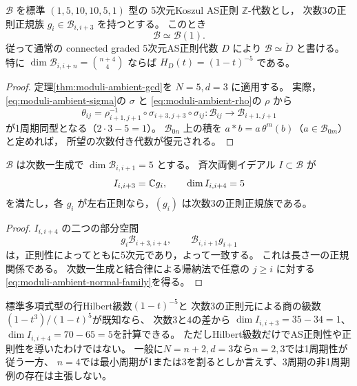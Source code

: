 \begin{corollary}\label{cor:moduli-cubic-ambient-periodic}
$\mathcal B$ を標準 $(1,5,10,10,5,1)$ 型の
5次元Koszul AS正則 $\mathbb Z$-代数とし，
次数3の正則正規族 $g_i\in\mathcal B_{i,i+3}$ を持つとする。
このとき
\begin{equation}
 \mathcal B\simeq\mathcal B(1).
\end{equation}
従って通常の connected graded 5次元AS正則代数 $D$ により
$\mathcal B\simeq\check D$ と書ける。
特に $\dim\mathcal B_{i,i+n}=\binom{n+4}{4}$ ならば
$H_D(t)=(1-t)^{-5}$ である。
\end{corollary}
\begin{proof}
定理\ref{thm:moduli-ambient-gcd}を $N=5,d=3$ に適用する。
実際，\eqref{eq:moduli-ambient-sigma}の $\sigma$ と
\eqref{eq:moduli-ambient-rho}の $\rho$ から
\begin{equation}
 \theta_{ij}=
 \rho^{-1}_{i+1,j+1}\circ
 \sigma_{i+3,j+3}\circ\sigma_{ij}:
 \mathcal B_{ij}\longrightarrow\mathcal B_{i+1,j+1}
\end{equation}
が1周期同型となる（$2\cdot3-5=1$）。
$\mathcal B_{0n}$ 上の積を
$a*b=a\,\theta^m(b)$（$a\in\mathcal B_{0m}$）と定めれば，
所望の次数付き代数が復元される。
\end{proof}

\begin{proposition}[低次数の核からの正規性判定]\label{prop:moduli-cubic-normal-criterion}
$\mathcal B$ は次数一生成で
$\dim\mathcal B_{i,i+1}=5$ とする。
斉次両側イデアル $I\subset\mathcal B$ が
\begin{equation}
 I_{i,i+3}=\mathbb C g_i,\qquad \dim I_{i,i+4}=5
\end{equation}
を満たし，各 $g_i$ が左右正則なら，$(g_i)$ は次数3の正則正規族である。
\end{proposition}
\begin{proof}
$I_{i,i+4}$ の二つの部分空間
\begin{equation}
 g_i\mathcal B_{i+3,i+4},
 \qquad \mathcal B_{i,i+1}g_{i+1}
\end{equation}
は，正則性によってともに5次元であり，よって一致する。
これは長さ一の正規関係である。
次数一生成と結合律による帰納法で任意の $j\geq i$ に対する
\eqref{eq:moduli-ambient-normal-family}を得る。
\end{proof}

標準多項式型の行Hilbert級数$(1-t)^{-5}$と
次数3の正則元による商の級数$(1-t^3)/(1-t)^5$が既知なら、
次数3と4の差から
$\dim I_{i,i+3}=35-34=1$、$\dim I_{i,i+4}=70-65=5$を計算できる。
ただしHilbert級数だけでAS正則性や正則性を導いたわけではない。
一般に$N=n+2,d=3$なら$n=2,3$では1周期性が従う一方、
$n=4$では最小周期が1または3を割るとしか言えず、3周期の非1周期例の存在は主張しない。

